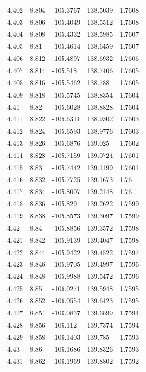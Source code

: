 \begin{tabular}{lllll}
4.402 & 8.804 & -105.3767 & 138.5039 & 1.7608 \\
4.403 & 8.806 & -105.4049 & 138.5512 & 1.7608 \\
4.404 & 8.808 & -105.4332 & 138.5985 & 1.7607 \\
4.405 & 8.81 & -105.4614 & 138.6459 & 1.7607 \\
4.406 & 8.812 & -105.4897 & 138.6932 & 1.7606 \\
4.407 & 8.814 & -105.518 & 138.7406 & 1.7605 \\
4.408 & 8.816 & -105.5462 & 138.788 & 1.7605 \\
4.409 & 8.818 & -105.5745 & 138.8354 & 1.7604 \\
4.41 & 8.82 & -105.6028 & 138.8828 & 1.7604 \\
4.411 & 8.822 & -105.6311 & 138.9302 & 1.7603 \\
4.412 & 8.824 & -105.6593 & 138.9776 & 1.7603 \\
4.413 & 8.826 & -105.6876 & 139.025 & 1.7602 \\
4.414 & 8.828 & -105.7159 & 139.0724 & 1.7601 \\
4.415 & 8.83 & -105.7442 & 139.1199 & 1.7601 \\
4.416 & 8.832 & -105.7725 & 139.1673 & 1.76 \\
4.417 & 8.834 & -105.8007 & 139.2148 & 1.76 \\
4.418 & 8.836 & -105.829 & 139.2622 & 1.7599 \\
4.419 & 8.838 & -105.8573 & 139.3097 & 1.7599 \\
4.42 & 8.84 & -105.8856 & 139.3572 & 1.7598 \\
4.421 & 8.842 & -105.9139 & 139.4047 & 1.7598 \\
4.422 & 8.844 & -105.9422 & 139.4522 & 1.7597 \\
4.423 & 8.846 & -105.9705 & 139.4997 & 1.7596 \\
4.424 & 8.848 & -105.9988 & 139.5472 & 1.7596 \\
4.425 & 8.85 & -106.0271 & 139.5948 & 1.7595 \\
4.426 & 8.852 & -106.0554 & 139.6423 & 1.7595 \\
4.427 & 8.854 & -106.0837 & 139.6899 & 1.7594 \\
4.428 & 8.856 & -106.112 & 139.7374 & 1.7594 \\
4.429 & 8.858 & -106.1403 & 139.785 & 1.7593 \\
4.43 & 8.86 & -106.1686 & 139.8326 & 1.7593 \\
4.431 & 8.862 & -106.1969 & 139.8802 & 1.7592 \\

\end{tabular}
